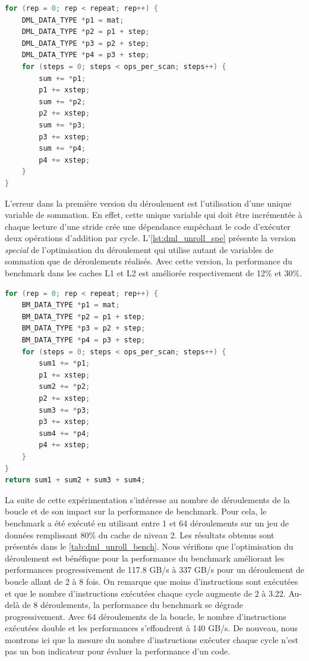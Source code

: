     \begin{lstlisting}[label=lst:dml_unroll_orig ,language=C, caption=Première version du déroulement de la boucle par 4.]
for (rep = 0; rep < repeat; rep++) {
    DML_DATA_TYPE *p1 = mat;
    DML_DATA_TYPE *p2 = p1 + step;
    DML_DATA_TYPE *p3 = p2 + step;
    DML_DATA_TYPE *p4 = p3 + step;
    for (steps = 0; steps < ops_per_scan; steps++) {
        sum += *p1;
        p1 += xstep;
        sum += *p2;
        p2 += xstep;
        sum += *p3;
        p3 += xstep;
        sum += *p4;
        p4 += xstep;
    }
}
\end{lstlisting}


    L'erreur dans la première version du déroulement est l'utilisation d'une unique variable de sommation. En effet, cette unique variable qui doit être incrémentée à chaque lecture d'une stride crée une dépendance empêchant le code d'exécuter deux opérations d'addition par cycle. L'\autoref{lst:dml_unroll_spe} présente la version \textit{special} de l'optimisation du déroulement qui utilise autant de variables de sommation que de déroulements réalisés. Avec cette version, la performance du benchmark dans les caches L1 et L2 est améliorée respectivement de 12\% et 30\%. 
    
    \begin{lstlisting}[label=lst:dml_unroll_spe ,language=C, caption=Deuxième version du déroulement par 4 utilisant 4 variables sum.]
for (rep = 0; rep < repeat; rep++) {
    BM_DATA_TYPE *p1 = mat;
    BM_DATA_TYPE *p2 = p1 + step;
    BM_DATA_TYPE *p3 = p2 + step;
    BM_DATA_TYPE *p4 = p3 + step;
    for (steps = 0; steps < ops_per_scan; steps++) {
        sum1 += *p1;
        p1 += xstep;
        sum2 += *p2;
        p2 += xstep;
        sum3 += *p3;
        p3 += xstep;
        sum4 += *p4;
        p4 += xstep;
    }
}
return sum1 + sum2 + sum3 + sum4;
\end{lstlisting}
    
    La suite de cette expérimentation s'intéresse au nombre de déroulements de la boucle et de son impact sur la performance de benchmark. Pour cela, le benchmark a été exécuté en utilisant entre 1 et 64 déroulements sur un jeu de données remplissant 80\% du cache de niveau 2. Les résultats obtenus sont présentés dans le \autoref{tab:dml_unroll_bench}. Nous vérifions que l'optimisation du déroulement est bénéfique pour la performance du benchmark améliorant les performances progressivement de 117.8 GB/s à 337 GB/s pour un déroulement de boucle allant de 2 à 8 fois. On remarque que moins d'instructions sont exécutées et que le nombre d'instructions exécutées chaque cycle augmente de 2 à 3.22. Au-delà de 8 déroulements, la performance du benchmark se dégrade progressivement. Avec 64 déroulements de la boucle, le nombre d'instructions exécutées double et les performances s'effondrent à 140 GB/s. De nouveau, nous montrons ici que la mesure du nombre d'instructions exécuter chaque cycle n'est pas un bon indicateur pour évaluer la performance d'un code. 
    

